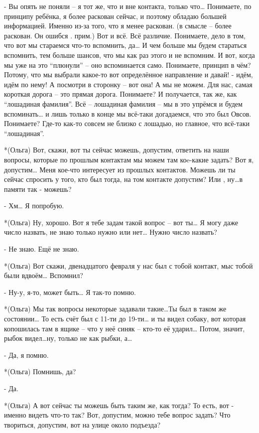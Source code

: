 - Вы опять не поняли – я тот же, что и вне контакта, только что… Понимаете, по принципу ребёнка, я более раскован сейчас, и поэтому обладаю большей информацией. Именно из-за того, что я менее раскован. (в смысле – более раскован. Он ошибся . прим.) Вот и всё. Всё различие. Понимаете, дело в том, что вот мы стараемся что-то вспомнить, да… И чем больше мы будем стараться вспомнить, тем больше шансов, что мы как раз этого и не вспомним. И вот, когда мы уже на это “плюнули” – оно вспоминается само. Понимаете, принцип в чём? Потому, что мы выбрали какое-то вот определённое направление и давай! - идём, идём по нему! А посмотри в сторонку – вот она! А мы не можем. Для нас, самая короткая дорога – это прямая дорога. Понимаете? И получается, так же, как “лошадиная фамилия”. Всё – лошадиная фамилия – мы в это упрёмся и будем вспоминать… и лишь только в конце мы всё-таки догадаемся, что это был Овсов. Понимаете? Где-то как-то совсем не близко с лошадью, но главное, что всё-таки “лошадиная”.

*(Ольга) Вот, скажи, вот ты сейчас можешь, допустим, ответить на наши вопросы, которые по прошлым контактам мы можем там коe-какие задать? Вот я, допустим… Меня кое-что интересует из прошлых контактов. Можешь ли ты сейчас спросить у того, кто был тогда, на том контакте допустим? Или , ну…в памяти так - можешь?

- Хм… Я попробую.

*(Ольга) Ну, хорошо. Вот я тебе задам такой вопрос – вот ты… Я могу даже число назвать, не  знаю только нужно или нет… Нужно число назвать?

- Не знаю. Ещё не знаю.

*(Ольга) Вот скажи, двенадцатого февраля у нас был с тобой контакт, мыс тобой были вдвоём… Вспомнил?

- Ну-у, я-то, может быть… Я так-то помню.

*(Ольга) Мы так вопросы некоторые задавали такие…Ты был в таком же состоянии…  То есть счёт  был с 11-ти до 19-ти… и ты видел собаку,  вот которая  копошилась там в ящике – что у неё синяк – кто-то её ударил… Потом, значит, рыбок видел…ну, только  не как рыбки, а…

- Да, я помню.

*(Ольга) Помнишь, да?

- Да.

*(Ольга) А вот сейчас ты можешь быть таким же, как тогда? То есть, вот - именно  видеть что-то так? Вот, допустим, можно тебе вопрос задать? Что твориться, допустим, вот на улице  около подъезда?

